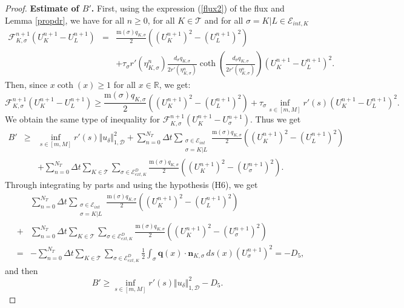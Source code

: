 \documentclass[smallextended]{svjour3}
\begin{document}
\begin{proof}
\textbf{Estimate of $B'$.} First, using the expression (\ref{flux2}) of the flux and Lemma \ref{propdr}, we have for all $n \geq 0$, for all $K \in \mathcal{T}$ and for all $\sigma=K|L \in \mathcal{E}_{int,K}$
\begin{eqnarray*}
\mathcal{F}^{n+1}_{K,\sigma}\left(U^{n+1}_{K}-U^{n+1}_{L}\right) &=& \frac{\text{m}(\sigma)q_{K,\sigma}}{2}\left(\left(U_{K}^{n+1}\right)^{2}-\left(U^{n+1}_{L}\right)^{2}\right)\\
& & + \tau_{\sigma} r'(\eta_{K,\sigma}^{n})\frac{d_{\sigma}q_{K,\sigma}}{2r'(\eta_{K,\sigma}^{n})} \coth\left(\frac{d_{\sigma}q_{K,\sigma}}{2r'(\eta_{K,\sigma}^{n})}\right)\left(U^{n+1}_{K}-U^{n+1}_{L}\right)^{2}.
\end{eqnarray*}  
Then, since $x\coth(x) \geq 1$ for all $x\in \mathbb{R}$, we get:
\begin{equation*}
\mathcal{F}^{n+1}_{K,\sigma}\left(U^{n+1}_{K}-U^{n+1}_{L}\right) \geq  \frac{\text{m}(\sigma)q_{K,\sigma}}{2}\left(\left(U_{K}^{n+1}\right)^{2}-\left(U^{n+1}_{L}\right)^{2}\right) + \tau_{\sigma}\inf_{s \in [m,M]}r'(s) \left(U^{n+1}_{K}-U^{n+1}_{L}\right)^{2}.
\end{equation*}
We obtain the same type of inequality for $\mathcal{F}^{n+1}_{K,\sigma}\left(U^{n+1}_{K}-U^{n+1}_{\sigma}\right)$. Thus we get 
\begin{eqnarray*}
B' &\geq & \inf_{s \in [m,M]}r'(s)\Vert u_{\delta}\Vert_{1,\mathcal{D}}^{2}+\sum_{n=0}^{N_{T}}\Delta t\sum_{\substack{\sigma \in \mathcal{E}_{int} \\ \sigma=K|L}} \frac{\text{m}(\sigma)q_{K,\sigma}}{2}\left(\left(U_{K}^{n+1}\right)^{2}-\left(U^{n+1}_{L}\right)^{2}\right)\\
& &+\sum_{n=0}^{N_{T}}\Delta t\sum_{K\in \mathcal{T}}\sum_{\sigma \in \mathcal{E}_{ext,K}^{D}}\frac{\text{m}(\sigma)q_{K,\sigma}}{2}\left(\left(U_{K}^{n+1}\right)^{2}-\left(U^{n+1}_{\sigma}\right)^{2}\right).
\end{eqnarray*}
Through integrating by parts and using the hypothesis (H6), we get
\begin{eqnarray*}
& &\sum_{n=0}^{N_{T}}\Delta t\sum_{\substack{\sigma \in \mathcal{E}_{int} \\ \sigma=K|L}} \frac{\text{m}(\sigma)q_{K,\sigma}}{2}\left(\left(U_{K}^{n+1}\right)^{2}-\left(U^{n+1}_{L}\right)^{2}\right)\\
&+&\sum_{n=0}^{N_{T}}\Delta t\sum_{K\in \mathcal{T}}\sum_{\sigma \in \mathcal{E}_{ext,K}^{D}}\frac{\text{m}(\sigma)q_{K,\sigma}}{2}\left(\left(U_{K}^{n+1}\right)^{2}-\left(U^{n+1}_{\sigma}\right)^{2}\right) \\
& = & -\sum_{n=0}^{N_{T}}\Delta t \sum_{K\in \mathcal{T}}\sum_{\sigma \in \mathcal{E}_{ext,K}^{D}} \frac{1}{2}\int_{\sigma}\textbf{q}(x)\cdot \textbf{n}_{K,\sigma}\, ds(x) \left(U_{\sigma}^{n+1}\right)^{2}=-D_{5},
\end{eqnarray*}
and then 
\begin{equation}
B' \geq \inf_{s \in [m,M]}r'(s)\Vert u_{\delta}\Vert_{1,\mathcal{D}}^{2}-D_{5}.
\label{estimBp}
\end{equation}



\end{proof}
\end{document}
